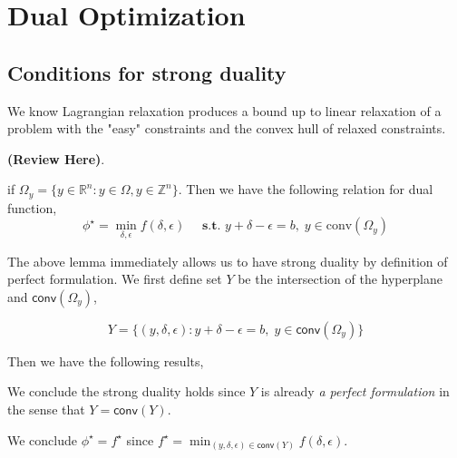 \documentclass[../main]{subfiles}
\begin{document}
\section{Dual Optimization}\label{sec:dual}


\subsection{Conditions for strong
  duality}\label{sec:dual.conditions-for-strong-duality}




We know Lagrangian relaxation produces a bound up to
linear relaxation of a problem with the "easy" constraints
and the convex hull of relaxed constraints.

\textbf{(Review Here)}.

\begin{lemma}\label{lemma.bound}
  if \(\Omega_y = \{y \in \mathbb R^n: y \in \Omega, y\in \mathbb Z^n\}\).
  Then we have the following relation for dual function,
  \[ \phi^\star = \min_{\delta, \epsilon} f(\delta, \epsilon)\quad \textbf{ s.t. }  y + \delta - \epsilon = b,\; y \in \textrm{conv}(\Omega_y)\]
\end{lemma}

The above lemma immediately allows us to have strong duality by definition of perfect formulation. We first define set \(Y\) be the intersection of the hyperplane and \(\textsf{conv}(\Omega_y)\),

\begin{equation}
  Y = \{(y, \delta, \epsilon): y + \delta - \epsilon = b,\; y \in \textsf{conv}(\Omega_y)\}
\end{equation}

Then we have the following results,

\begin{corollary}\label{lemma.strong-ip}
  We conclude the strong duality holds since \(Y\) is already \emph{a perfect formulation} in the sense that
  \(Y = \textsf{conv}(Y)\).
\end{corollary}

We conclude \(\phi^\star = f^\star\) since
\(f^\star = \min_{(y, \delta, \epsilon) \in \textsf{conv}(Y)} f(\delta, \epsilon)\).
\end{document}
